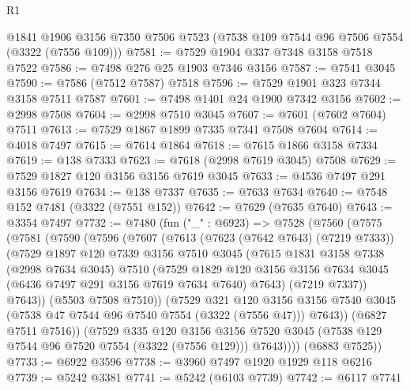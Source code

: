 \begin{lexlean}{R1}
\begin{coremodule}
    @1841
    @1906
    @3156
    @7350
    @7506
    @7523
    (@7538 @109 @7544 @96 @7506 @7554 (@3322 (@7556 @109)))
@7581 := @7529 @1904 @337 @7348 @3158 @7518 @7522
@7586 := @7498 @276 @25 @1903 @7346 @3156
@7587 := @7541 @3045
@7590 := @7586 (@7512 @7587) @7518
@7596 := @7529 @1901 @323 @7344 @3158 @7511 @7587
@7601 := @7498 @1401 @24 @1900 @7342 @3156
@7602 := @2998 @7508
@7604 := @2998 @7510 @3045
@7607 := @7601 (@7602 @7604) @7511
@7613 := @7529 @1867 @1899 @7335 @7341 @7508 @7604
@7614 := @4018 @7497
@7615 := @7614 @1864
@7618 := @7615 @1866 @3158 @7334
@7619 := @138 @7333
@7623 := @7618 (@2998 @7619 @3045) @7508
@7629 := @7529 @1827 @120 @3156 @3156 @7619 @3045
@7633 := @4536 @7497 @291 @3156 @7619
@7634 := @138 @7337
@7635 := @7633 @7634
@7640 := @7548 @152 @7481 (@3322 (@7551 @152))
@7642 := @7629 (@7635 @7640)
@7643 := @3354 @7497
@7732 := @7480
    (fun ("_" : @6923) =>
    @7528
      (@7560
        (@7575
          (@7581
            (@7590
              (@7596
                (@7607
                  (@7613
                    (@7623 (@7642 @7643) (@7219 @7333))
                    (@7529
                      @1897
                      @120
                      @7339
                      @3156
                      @7510
                      @3045
                      (@7615
                        @1831
                        @3158
                        @7338
                        (@2998 @7634 @3045)
                        @7510
                        (@7529
                          @1829
                          @120
                          @3156
                          @3156
                          @7634
                          @3045
                          (@6436 @7497 @291 @3156 @7619 @7634 @7640)
                          @7643)
                        (@7219 @7337))
                      @7643))
                  (@5503 @7508 @7510))
                (@7529
                  @321
                  @120
                  @3156
                  @3156
                  @7540
                  @3045
                  (@7538 @47 @7544 @96 @7540 @7554 (@3322 (@7556 @47)))
                  @7643))
              (@6827 @7511 @7516))
            (@7529
              @335
              @120
              @3156
              @3156
              @7520
              @3045
              (@7538 @129 @7544 @96 @7520 @7554 (@3322 (@7556 @129)))
              @7643))))
      (@6883 @7525))
@7733 := @6922 @3596
@7738 := @3960 @7497 @1920 @1929 @118 @6216
@7739 := @5242 @3381
@7741 := @5242 (@6103 @7739)
@7742 := @6117 @7741

\end{coremodule}
\end{lexlean}
